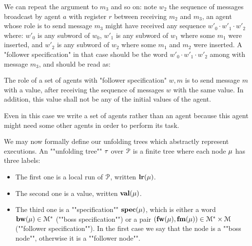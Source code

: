 We can repeat the argument to $m_3$ and so on: note $w_2$ the sequence of messages broadcast by agent $a$ with register $r$ between receiving $m_2$ and $m_3$, an agent whose role is to send message $m_3$ might have received any sequence $w'_0\cdot w'_1 \cdot w'_2$ where: $w'_0$ is any subword of $w_0$, $w'_1$ is any subword of $w_1$ where some $m_1$ were inserted, and $w'_2$ is any subword of $w_2$ where some $m_1$ and $m_2$ were inserted. A "follower specification" in that case should be the word $w'_0 \cdot w'_1 \cdot w'_2$ among with message $m_3$, and should be read as:
\begin{center}
		{The role of a set of agents with "follower specification" $w, m$ is to send message $m$ with a value, after receiving the sequence of messages $w$ with the same value. In addition, this value shall not be any of the initial values of the agent}.
\end{center}
Even in this case we write a set of agents rather than an agent because this agent might need some other agents in order to perform its task.
%
%


We may now formally define our unfolding trees which abstractly represent executions. 
\AP An ""unfolding tree"" $\tau$ over $\mathcal{P}$ is
a finite tree where each node $\mu$ has three labels:
\begin{itemize}
	\item The first one is a local run of $\mathcal{P}$, written $\mathbf{lr}(\mu)$. 
	
	\item The second one is a value, written $\mathbf{val}(\mu)$.
	
	\item The third one is a ""specification"" $\mathbf{spec}(\mu)$, which is either a word $\mathbf{bw}(\mu) \in \mathcal{M}^*$ (""boss specification"") or a pair $(\mathbf{fw}(\mu), \mathbf{fm}(\mu)) \in \mathcal{M}^* \times \mathcal{M}$ (""follower specification""). In the first case we say that the node is a ""boss node"", otherwise it is a ""follower node"".
\end{itemize} 



